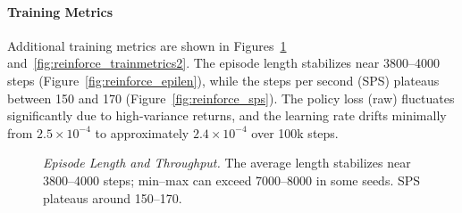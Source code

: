 \paragraph{Training Metrics}
Additional training metrics are shown in Figures~\ref{fig:reinforce_trainmetrics1} and~\ref{fig:reinforce_trainmetrics2}. The episode length stabilizes near 3800–4000 steps (Figure~\ref{fig:reinforce_epilen}), while the steps per second (SPS) plateaus between 150 and 170 (Figure~\ref{fig:reinforce_sps}). The policy loss (raw) fluctuates significantly due to high-variance returns, and the learning rate drifts minimally from $2.5\times10^{-4}$ to approximately $2.4\times10^{-4}$ over 100k steps.
\begin{figure}
	\centering
	\quad
	\caption{\textit{Episode Length and Throughput.} 
		The average length stabilizes near 3800–4000 steps; 
		min–max can exceed 7000–8000 in some seeds. 
		SPS plateaus around 150–170.}
	\label{fig:reinforce_trainmetrics1}
\end{figure}

